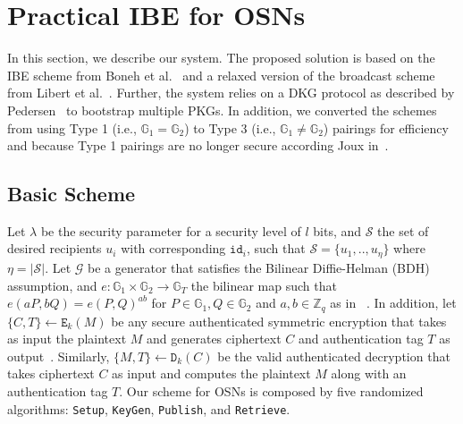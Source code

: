 \documentclass{llncs}
\newcommand{\id}[1]{\ensuremath{\mathtt{id}_{#1}}}
\begin{document}
\section{Practical IBE for OSNs}\label{sec:solution}

In this section, we describe our system. The proposed solution is based on the IBE scheme from Boneh et al.~\cite{BonehFranklinIBE} and a relaxed version of the broadcast scheme from Libert et al.~\cite{LibertANOBE}. Further, the system relies on a DKG protocol as described by Pedersen~\cite{Pedersen:1991:NIS:646756.705507} to bootstrap multiple PKGs. In addition, we converted the schemes from using Type 1 (i.e., $\mathbb{G}_1 = \mathbb{G}_2$) to Type 3 (i.e., $\mathbb{G}_1 \neq \mathbb{G}_2$) pairings for efficiency~\cite{Galbraith:2008:PC:1450345.1450543} and because Type 1 pairings are no longer secure according Joux in~\cite{DBLP:journals/iacr/Joux13}.


\subsection{Basic Scheme}

Let $\lambda$ be the security parameter for a security level of $l$ bits, and $\mathcal{S}$ the set of desired recipients $u_i$ with corresponding \id{i}, such that $\mathcal{S} = \{u_1,..,u_\eta\}$ where $\eta=|\mathcal{S}|$. Let $\mathcal{G}$ be a generator that satisfies the Bilinear Diffie-Helman (BDH) assumption, and $e: \mathbb{G}_1 \times \mathbb{G}_2 \rightarrow \mathbb{G}_T$ the bilinear map such that $e \left( aP, bQ \right) = e \left( P, Q \right)^{ab}$ for $P \in \mathbb{G}_1, Q\in \mathbb{G}_2$ and $a,b \in \mathbb{Z}_q$ as in~\cite{BonehFranklinIBE} .
In addition, let $\{ C, T\} \leftarrow \mathtt{E}_k(M)$ be any secure authenticated symmetric encryption that takes as input the plaintext $M$ and generates ciphertext $C$ and authentication tag $T$ as output~\cite{rfc5288}. Similarly, $\{ M, T \} \leftarrow \mathtt{D}_k(C)$ be the valid authenticated decryption that takes ciphertext $C$ as input and computes the plaintext $M$ along with an authentication tag $T$. 
Our scheme for OSNs is composed by five randomized algorithms: \texttt{Setup}, \texttt{KeyGen}, \texttt{Publish}, and \texttt{Retrieve}.

\medskip
\end{document}
